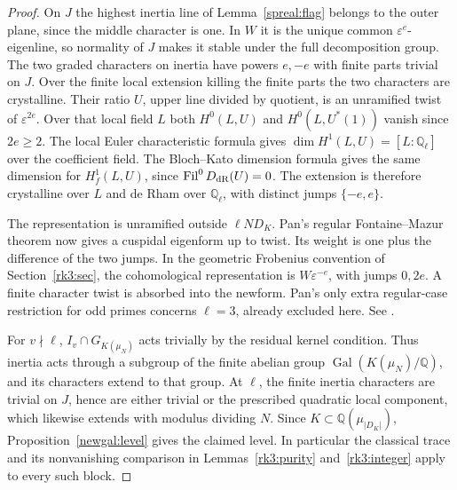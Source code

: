 \begin{proof}
On \(J\) the highest inertia line of Lemma~\ref{spreal:flag} belongs
to the outer plane, since the middle character is one. In \(W\) it
is the unique common \(\varepsilon^e\)-eigenline, so normality of
\(J\) makes it stable under the full decomposition group. The two
graded characters on inertia have powers \(e,-e\) with finite parts
trivial on \(J\). Over the finite local extension killing the finite
parts the two characters are crystalline. Their ratio \(U\), upper
line divided by quotient, is an unramified twist of \(\varepsilon^{2e}\).
Over that local field \(L\) both \(H^0(L,U)\) and \(H^0(L,U^*(1))\)
vanish since \(2e\ge2\). The local Euler characteristic formula gives
\(\dim H^1(L,U)=[L:\mathbb Q_\ell]\) over the coefficient field.
The Bloch--Kato dimension formula gives the same dimension for
\(H^1_f(L,U)\), since \(\operatorname{Fil}^0 D_{\rm dR}(U)=0\).
The extension is therefore crystalline over \(L\) and de Rham over
\(\mathbb Q_\ell\), with distinct jumps \(\{-e,e\}\).

The representation is unramified outside \(\ell N D_K\).
Pan's regular Fontaine--Mazur theorem now gives a cuspidal eigenform
up to twist. Its weight is one plus the difference of the two jumps.
In the geometric Frobenius convention of Section~\ref{rk3:sec}, the
cohomological representation is \(W\varepsilon^{-e}\), with jumps
\(0,2e\). A finite character twist is absorbed into the newform.
Pan's only extra regular-case restriction for odd primes concerns
\(\ell=3\), already excluded here.
See \cite[Theorem 1.0.4]{panFM}.

For \(v\nmid\ell\), \(I_v\cap G_{K(\mu_N)}\) acts trivially by the
residual kernel condition. Thus inertia acts through a subgroup of
the finite abelian group \(\operatorname{Gal}(K(\mu_N)/\mathbb Q)\),
and its characters extend to that group. At \(\ell\), the finite
inertia characters are trivial on \(J\), hence are either trivial
or the prescribed quadratic local component, which likewise extends
with modulus dividing \(N\). Since \(K\subset\mathbb Q(\mu_{|D_K|})\),
Proposition~\ref{newgal:level} gives the claimed level. In particular
the classical trace and its nonvanishing comparison in
Lemmas~\ref{rk3:purity} and~\ref{rk3:integer} apply to every such block.
\end{proof}


